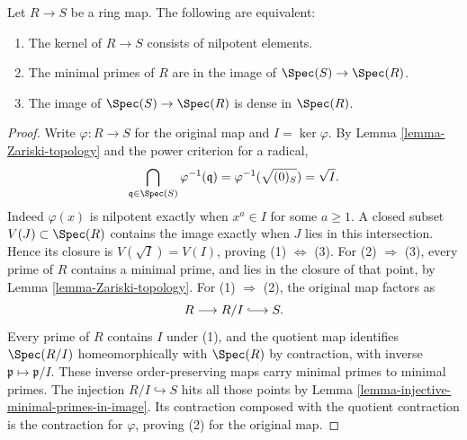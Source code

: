 \begin{lemma}
\label{lemma-image-dense-generic-points}
Let $R \to S$ be a ring map. The following are equivalent:
\begin{enumerate}
\item The kernel of $R \to S$ consists of nilpotent elements.
\item The minimal primes of $R$ are in the image of
$\Spec(S) \to \Spec(R)$.
\item The image of $\Spec(S) \to \Spec(R)$ is dense
in $\Spec(R)$.
\end{enumerate}
\end{lemma}

\begin{proof}
Write $\varphi:R\to S$ for the original map and $I=\ker\varphi$.
By Lemma \ref{lemma-Zariski-topology} and the power criterion for a
radical,
$$
\bigcap_{\mathfrak q\in\Spec(S)}\varphi^{-1}(\mathfrak q)
=\varphi^{-1}(\sqrt{(0)_S})=\sqrt I.
$$
Indeed $\varphi(x)$ is nilpotent exactly when $x^a\in I$ for some
$a\geq1$. A closed subset $V(J)\subset\Spec(R)$ contains the image
exactly when $J$ lies in this intersection. Hence its closure is
$V(\sqrt I)=V(I)$, proving (1) $\Leftrightarrow$ (3).
For (2) $\Rightarrow$ (3), every prime of $R$ contains a minimal
prime, and lies in the closure of that point, by
Lemma \ref{lemma-Zariski-topology}.
For (1) $\Rightarrow$ (2), the original map factors as
$$
R\longrightarrow R/I\lhook\joinrel\longrightarrow S.
$$
Every prime of $R$ contains $I$ under (1), and the quotient map
identifies $\Spec(R/I)$ homeomorphically with $\Spec(R)$ by
contraction, with inverse $\mathfrak p\mapsto\mathfrak p/I$.
These inverse order-preserving maps carry minimal primes to minimal
primes. The injection $R/I\hookrightarrow S$ hits all those points
by Lemma \ref{lemma-injective-minimal-primes-in-image}. Its contraction
composed with the quotient contraction is the contraction for
$\varphi$, proving (2) for the original map.
\end{proof}